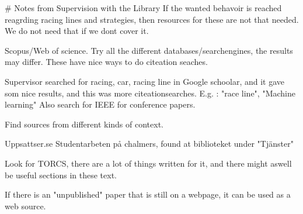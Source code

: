 # Notes from Supervision with the Library
If the wanted behavoir is reached reagrding racing lines and strategies, then resources for these are not that needed. We do not need that if we dont cover it.

Scopus/Web of science. Try all the different databases/searchengines, the results may differ.
These have nice ways to do citeation seaches.

Supervisor searched for racing, car, racing line in Google schoolar, and it gave som nice results, and this was more citeationsearches. E.g. : "race line", "Machine learning"
Also search for IEEE for conference papers.

Find sources from different kinds of context.

Uppsattser.se
Studentarbeten på chalmers, found at biblioteket under "Tjänster"

Look for TORCS, there are a lot of things written for it, and there might aswell be useful sections in these text.

If there is an "unpublished" paper that is still on a webpage, it can be used as a web source. 